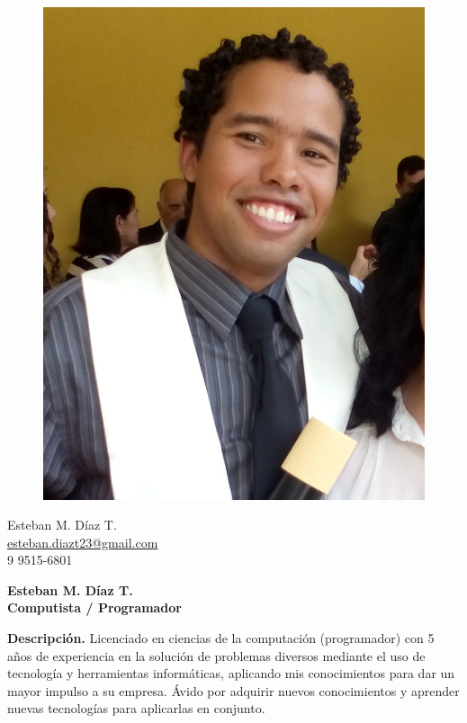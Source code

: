 \documentclass[a4paper,12pt,final]{memoir}
\newcommand{\Sep}{\vspace{1.5em}}
\newenvironment{AboutMe}
	{\ignorespaces\textbf{\color{RoyalBlue} Descripción.}}
	{\Sep\ignorespacesafterend}
\begin{document}
%
\begin{figure}
	\hfill
	\includegraphics[width=0.8\columnwidth]{foto.jpg}
	\vspace{-7cm}
\end{figure}

\begin{flushright}\small
	Esteban M. Díaz T. \\
	\tiny{\url{esteban.diazt23@gmail.com}}\\
	9 9515-6801 
\end{flushright}\normalsize
\framebreak


\Huge\bfseries {\color{RoyalBlue} Esteban M. Díaz T.} \\
\Large\bfseries  Computista / Programador \\

\normalsize\normalfont

\begin{AboutMe}
Licenciado en ciencias de la computación (programador) con 5 años de experiencia
en la solución de problemas diversos mediante el uso de tecnología y herramientas
informáticas, aplicando mis conocimientos para dar un mayor impulso a su empresa.
Ávido por adquirir nuevos conocimientos y aprender nuevas tecnologías para
aplicarlas en conjunto.
\end{AboutMe}
\end{document}
